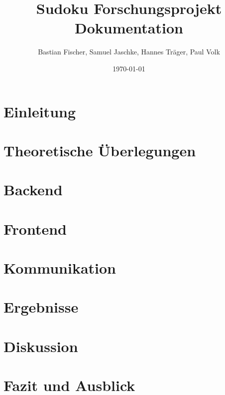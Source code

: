 \documentclass[12pt,a4paper]{article}
\title{Sudoku Forschungsprojekt Dokumentation}
\author{Bastian Fischer, Samuel Jaschke, Hannes Träger, Paul Volk}
\date{\today}
\begin{document}
\maketitle

\begin{abstract}
\end{abstract}

\section{Einleitung}




\section{Theoretische Überlegungen}
\label{sec:theoretische_ueberlegungen}



\section{Backend}
\label{sec:backend}


\section{Frontend}
\label{sec:frontend}


\section{Kommunikation}
\label{sec:kommunikation}


\section{Ergebnisse}

\section{Diskussion}

\section{Fazit und Ausblick}





\end{document}
